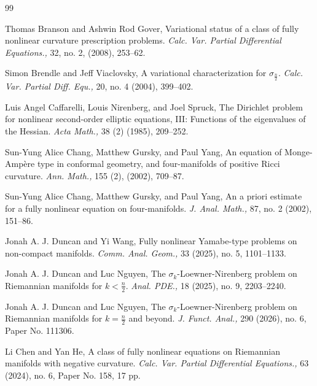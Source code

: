 \documentclass{article}
\theoremstyle{plain}
\theoremstyle{definition}
\theoremstyle{definition}
\numberwithin{equation}{section}
\begin{document}
\begin{sloppypar}
\begin{thebibliography}{99}
 


 Thomas Branson and  Ashwin Rod  Gover, 
Variational status of a class of fully nonlinear curvature
prescription problems. 
{\em Calc. Var. Partial Differential Equations.,}
32, no. 2, (2008), 253--62.

 Simon Brendle and Jeff Viaclovsky, A variational characterization for $\sigma_{\frac{n}{2}}$.
{\em Calc. Var. Partial Diff. Equ.,}
20, no. 4 (2004), 399--402.



 Luis Angel Caffarelli,  Louis Nirenberg, and Joel Spruck, The Dirichlet problem for nonlinear second-order elliptic equations, III: Functions of the eigenvalues of the Hessian.  {\em Acta Math.,} 38 (2) (1985), 209--252.

 Sun-Yung Alice Chang, Matthew Gursky, and Paul Yang,  An equation of Monge-Amp\`ere type in conformal
geometry, and four-manifolds of positive Ricci curvature.
{\em Ann. Math.,} 
155 (2),  (2002), 709--87.

 Sun-Yung Alice Chang, Matthew Gursky, and Paul Yang, An a priori estimate for a fully nonlinear equation on
four-manifolds. 
{\em J. Anal. Math.,} 87, no. 2 (2002), 151--86.

 Jonah A. J. Duncan and   Yi Wang,  Fully nonlinear Yamabe-type problems on non-compact manifolds. {\em Comm. Anal. Geom.,} 33 (2025), no. 5, 1101--1133.

 Jonah A. J. Duncan and Luc Nguyen,  The $\sigma_k$-Loewner-Nirenberg problem on Riemannian manifolds for $k<\frac{n}{2}$. {\em Anal. PDE.,} 18 (2025), no. 9, 2203--2240.

 Jonah A. J. Duncan and Luc Nguyen,  The $\sigma_k$-Loewner-Nirenberg problem on Riemannian manifolds for $k=\frac{n}{2}$ and beyond. {\em J. Funct. Anal.,} 290 (2026), no. 6, Paper No. 111306.


 Li Chen and Yan He,  A class of fully nonlinear equations on Riemannian manifolds with negative curvature. 
{\em Calc. Var. Partial Differential Equations.,}
63 (2024), no. 6, Paper No. 158, 17 pp.


\end{thebibliography}
\end{sloppypar}
\end{document}

